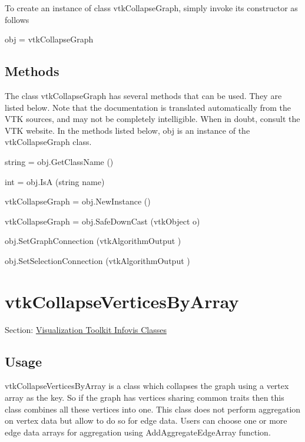 To create an instance of class vtk\-Collapse\-Graph, simply invoke its constructor as follows \begin{DoxyVerb}  obj = vtkCollapseGraph
\end{DoxyVerb}
 \hypertarget{vtkwidgets_vtkxyplotwidget_Methods}{}\subsection{Methods}\label{vtkwidgets_vtkxyplotwidget_Methods}
The class vtk\-Collapse\-Graph has several methods that can be used. They are listed below. Note that the documentation is translated automatically from the V\-T\-K sources, and may not be completely intelligible. When in doubt, consult the V\-T\-K website. In the methods listed below, {\ttfamily obj} is an instance of the vtk\-Collapse\-Graph class. 
\begin{DoxyItemize}
\item {\ttfamily string = obj.\-Get\-Class\-Name ()}  
\item {\ttfamily int = obj.\-Is\-A (string name)}  
\item {\ttfamily vtk\-Collapse\-Graph = obj.\-New\-Instance ()}  
\item {\ttfamily vtk\-Collapse\-Graph = obj.\-Safe\-Down\-Cast (vtk\-Object o)}  
\item {\ttfamily obj.\-Set\-Graph\-Connection (vtk\-Algorithm\-Output )}  
\item {\ttfamily obj.\-Set\-Selection\-Connection (vtk\-Algorithm\-Output )}  
\end{DoxyItemize}\hypertarget{vtkinfovis_vtkcollapseverticesbyarray}{}\section{vtk\-Collapse\-Vertices\-By\-Array}\label{vtkinfovis_vtkcollapseverticesbyarray}
Section\-: \hyperlink{sec_vtkinfovis}{Visualization Toolkit Infovis Classes} \hypertarget{vtkwidgets_vtkxyplotwidget_Usage}{}\subsection{Usage}\label{vtkwidgets_vtkxyplotwidget_Usage}
vtk\-Collapse\-Vertices\-By\-Array is a class which collapses the graph using a vertex array as the key. So if the graph has vertices sharing common traits then this class combines all these vertices into one. This class does not perform aggregation on vertex data but allow to do so for edge data. Users can choose one or more edge data arrays for aggregation using Add\-Aggregate\-Edge\-Array function.

